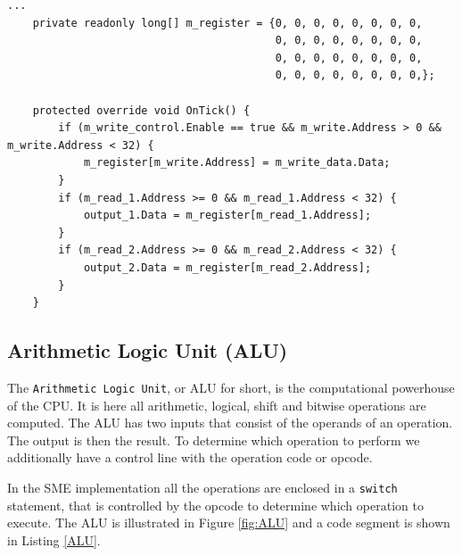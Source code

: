         \begin{minipage}{\linewidth}
            \begin{lstlisting}[language={[Sharp]C}, caption={A slice of the \texttt{register} process SME code. The register is declared as a signed 64-bit array with 32 elements. In every clock cycle the process checks if the write control signal is asserted. If it is, we check if the address to be written lies within the register range and is above 0, as this register is reserved to be hard-wired zero. Lastly the process reads the two specified registers and if they lie within the register range, they get outputted to the corresponding buses.},captionpos=b, label = REGISTER]
...
    private readonly long[] m_register = {0, 0, 0, 0, 0, 0, 0, 0,
                                          0, 0, 0, 0, 0, 0, 0, 0,
                                          0, 0, 0, 0, 0, 0, 0, 0,
                                          0, 0, 0, 0, 0, 0, 0, 0,};
            
    protected override void OnTick() {
        if (m_write_control.Enable == true && m_write.Address > 0 && m_write.Address < 32) {
            m_register[m_write.Address] = m_write_data.Data;          
        }
        if (m_read_1.Address >= 0 && m_read_1.Address < 32) { 
            output_1.Data = m_register[m_read_1.Address];
        }
        if (m_read_2.Address >= 0 && m_read_2.Address < 32) { 
            output_2.Data = m_register[m_read_2.Address];
        }
    }
            \end{lstlisting}
        \end{minipage}  
    
    \subsection{Arithmetic Logic Unit (ALU)}
        The \texttt{Arithmetic Logic Unit}, or ALU for short, is the computational powerhouse of the CPU. It is here all arithmetic, logical, shift and bitwise operations are computed.
        The ALU has two inputs that consist of the operands of an operation. The output is then the result. To determine which operation to perform we additionally have a control line with the operation code or opcode.
        
        In the SME implementation all the operations are enclosed in a \texttt{switch} statement, that is controlled by the opcode to determine which operation to execute. The ALU is illustrated in Figure \ref{fig:ALU} and a code segment is shown in Listing \ref{ALU}.
    
